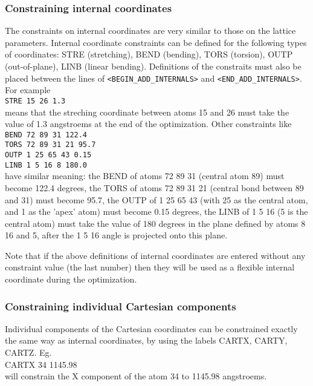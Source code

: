 \documentclass[prl,aps,preprint,superbib,12pt]{revtex4}
\begin{document}
\subsubsection{Constraining internal coordinates}
The constraints on internal coordinates are very similar to those
on the lattice parameters.
Internal coordinate constraints can be defined for the following types of coordinates:
STRE (stretching), BEND (bending), TORS (torsion), OUTP (out-of-plane), LINB 
(linear bending).
Definitions of the constraits must also be placed between the lines of
{\tt <BEGIN\_ADD\_INTERNALS>} and {\tt <END\_ADD\_INTERNALS>}.
\\
For example
\\
{\tt STRE 15 26 1.3} 
\\
means that the streching coordinate between atoms 15 and 26 must take 
the value of 1.3 angstroems at the end of the optimization.
Other constraints like
\\
{\tt BEND 72 89 31   122.4}
\\
{\tt TORS 72 89 31 21  95.7}
\\
{\tt OUTP  1 25 65 43  0.15}
\\
{\tt LINB  1 5 16  8  180.0}
\\
have similar meaning: the BEND of atoms 72 89 31 (central atom 89) 
must become 122.4 degrees,
the TORS of atoms 72 89 31 21 (central bond between 89 and 31) must 
become 95.7, the OUTP of 1 25 65 43 (with 25 as the central atom, 
and 1 as the 'apex' atom) must become 0.15 degrees,
the LINB of 1 5 16 (5 is the central atom) must take the value of 180 degrees
in the plane defined by atoms 8 16 and 5, after the 1 5 16 angle is projected 
onto this plane.

Note that if the above definitions of internal coordinates are entered
without any constraint value (the last number) then they will be used as 
a flexible internal coordinate during the optimization.

\subsubsection{Constraining individual Cartesian components}
Individual components of the Cartesian coordinates can be constrained 
exactly the same way as internal coordinates, by using the labels
CARTX, CARTY, CARTZ. Eg.
\\
CARTX 34 1145.98
\\
will constrain the X component of the atom 34 to 1145.98 angstroems.
\end{document}
